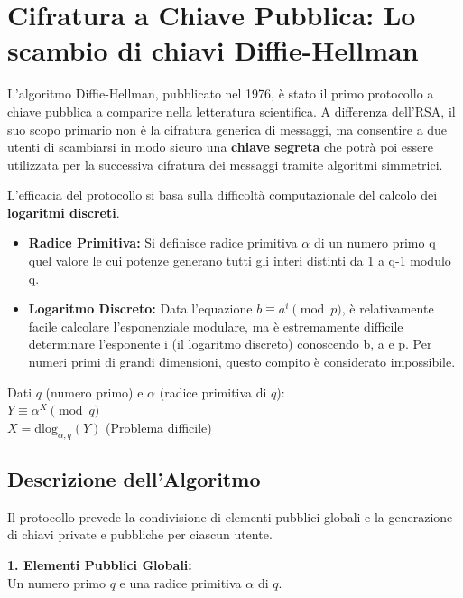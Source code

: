 \documentclass{article}
\begin{document}
\vspace{0.8cm}

\section*{Cifratura a Chiave Pubblica: Lo scambio di chiavi Diffie-Hellman}

L'algoritmo Diffie-Hellman, pubblicato nel 1976, è stato il primo protocollo a chiave pubblica a comparire nella letteratura scientifica. A differenza dell'RSA, il suo scopo primario non è la cifratura generica di messaggi, ma consentire a due utenti di scambiarsi in modo sicuro una \textbf{chiave segreta} che potrà poi essere utilizzata per la successiva cifratura dei messaggi tramite algoritmi simmetrici.

L'efficacia del protocollo si basa sulla difficoltà computazionale del calcolo dei \textbf{logaritmi discreti}.

\begin{itemize}
    \item \textbf{Radice Primitiva:} Si definisce radice primitiva $\alpha$ di un numero primo q quel valore le cui potenze generano tutti gli interi distinti da 1 a q-1 modulo q.
    \item \textbf{Logaritmo Discreto:} Data l'equazione $b \equiv a^i \pmod p$, è relativamente facile calcolare l'esponenziale modulare, ma è estremamente difficile determinare l'esponente i (il logaritmo discreto) conoscendo b, a e p. Per numeri primi di grandi dimensioni, questo compito è considerato impossibile.
\end{itemize}

\begin{center}
Dati $q$ (numero primo) e $\alpha$ (radice primitiva di $q$): \\
$Y \equiv \alpha^X \pmod q$ \\
$X = \text{dlog}_{\alpha, q}(Y)$ \quad (Problema difficile)
\end{center}

\subsection*{Descrizione dell'Algoritmo}

Il protocollo prevede la condivisione di elementi pubblici globali e la generazione di chiavi private e pubbliche per ciascun utente.

\vspace{0.3cm}
\noindent \textbf{1. Elementi Pubblici Globali:}\\
Un numero primo $q$ e una radice primitiva $\alpha$ di $q$.
\end{document}
